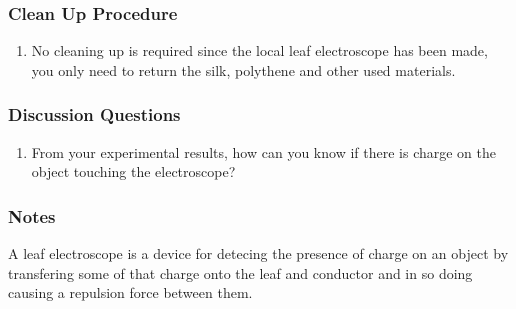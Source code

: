 \subsubsection*{Clean Up Procedure}
\begin{enumerate}
\item{No cleaning up is required since the local leaf electroscope has been made, you only need to return the silk, polythene and other used materials.} 
\end{enumerate}

\subsubsection*{Discussion Questions}
\begin{enumerate}
\item{From your experimental results, how can you know if there is charge on the object touching the electroscope?} 
\end{enumerate}

\subsubsection*{Notes}
A leaf electroscope is a device for detecing the presence of charge on an object by transfering some of that charge onto the leaf and conductor and in so doing causing a repulsion force between them.
